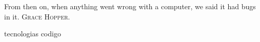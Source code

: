 %
%
%

{
  \epigrafe
  {%
    From then on, when anything went wrong with a computer, we said it had bugs
    in it.%
  }
  {%
     \textsc{Grace Hopper}.%
  }
}

\noindent

{tecnologias}
{codigo}
